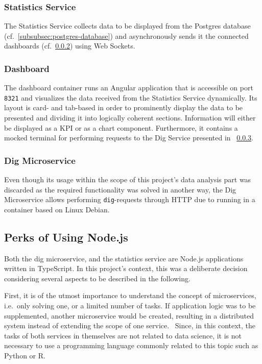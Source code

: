 \subsubsection{Statistics Service}\label{subsubsec:statistics-service}

The Statistics Service collects data to be displayed from the Postgres database (cf.~\ref{subsubsec:postgres-database}) and asynchronously sends it the connected dashboards (cf.~\ref{subsubsec:dashboard}) using Web Sockets.~\autocite[cf.][]{MDNWebDocs.2021}

\subsubsection{Dashboard}\label{subsubsec:dashboard}

The dashboard container runs an Angular application that is accessible on port \texttt{8321} and visualizes the data received from the Statistics Service dynamically.
Its layout is card- and tab-based in order to prominently display the data to be presented and dividing it into logically coherent sections.
Information will either be displayed as a KPI or as a chart component.
Furthermore, it contains a mocked terminal for performing requests to the Dig Service presented in ~\ref{subsubsec:dig-microservice}.

\subsubsection{Dig Microservice}\label{subsubsec:dig-microservice}

Even though its usage within the scope of this project's data analysis part was discarded as the required functionality was solved in another way, the Dig Microservice allows performing \texttt{dig}-requests through HTTP due to running in a container based on Linux Debian.

\subsection{Perks of Using Node.js}\label{subsec:choosing-a-node-based-environment}

Both the dig microservice, and the statistics service are Node.js applications written in TypeScript.
In this project's context, this was a deliberate decision considering several aspects to be described in the following.

First, it is of the utmost importance to understand the concept of microservices, i.e.\ only solving one, or a limited number of tasks.
If application logic was to be supplemented, another microservice would be created, resulting in a distributed system instead of extending the scope of one service.~\autocite[cf.][p. 23]{Farcic.2016}
Since, in this context, the tasks of both services in themselves are not related to data science, it is not necessary to use a programming language commonly related to this topic such as Python or R.~\autocite[cf.][]{Gossett.2021}

